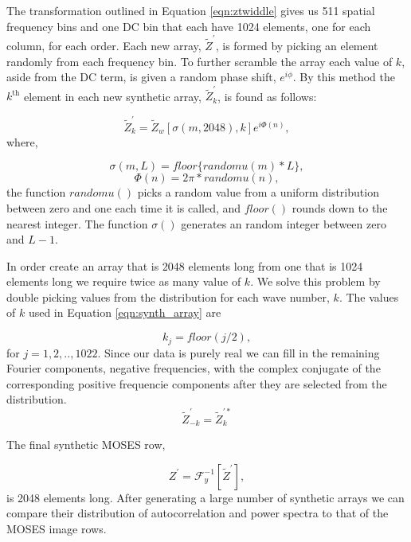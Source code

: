 \documentclass[]{solarphysics}
\begin{document}
\begin{article}
	The transformation outlined in Equation \ref{eqn:ztwiddle} gives us 511 spatial frequency bins and one DC bin that each have 1024 elements, one for each column, for each order.  Each new array, $\widetilde{Z}^{'}$, is formed by picking an element randomly from each frequency bin. To further scramble the array each value of $k$, aside from the DC term, is given a random phase shift, $e^{i\phi}$.  By this method the $k^{\mathrm{th}}$ element in each new synthetic array, $\widetilde{Z}_k^{'}$, is found as follows:
	
	\begin{equation}
		\widetilde{Z}_k^{'} = \widetilde{Z}_w\left[\sigma(m,2048), k  \right]e^{i\Phi(n)} ,
		\label{eqn:synth_array}
	\end{equation}
	where,
	
	\begin{equation}
		\sigma(m,L) = floor\{randomu(m)*L\} ,
	\end{equation}
	\begin{equation}
		\Phi(n) = 2\pi * randomu(n),
	\end{equation}
	the function $randomu()$ picks a random value from a uniform distribution between zero and one each time it is called, and $floor()$ rounds down to the nearest integer.  The function $\sigma()$ generates an random integer between zero and $L-1$.  
	
	In order create an array that is 2048 elements long from one that is 1024 elements long we require twice as many value of $k$.  We solve this problem by double picking values from the distribution for each wave number, $k$.  The values of $k$ used in Equation \ref{eqn:synth_array} are
	
	\begin{equation}
		k_j = floor(j/2),
	\end{equation}
	for $j = 1,2,..,1022.$ Since our data is purely real we can fill in the remaining Fourier components, negative frequencies, with the complex conjugate of the corresponding positive frequencie components after they are selected from the distribution.
	\begin{equation}
		\widetilde{Z}_{-k}^{'} = \widetilde{Z}_{k}^{'*}
	\end{equation}
	
	The final synthetic MOSES row, 
	
	\begin{equation}
		Z^{'} = \mathcal{F}_y^{-1}[\widetilde{Z}^{'}],
	\end{equation}
	is 2048 elements long.  After generating a large number of synthetic arrays we can compare their distribution of autocorrelation and power spectra to that of the MOSES image rows.
	

\end{article}
\end{document}
